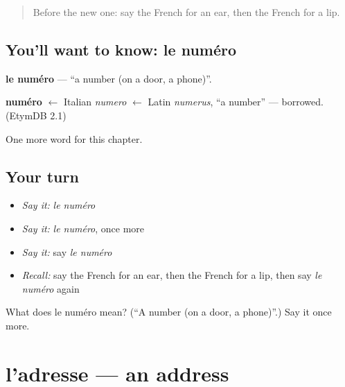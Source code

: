 \label{lesson:FR-C134-numero}



\begin{quote}
Before the new one: say the French for an ear, then the French for a lip.
\end{quote}

\subsection*{You'll want to know: le numéro}
\textbf{le numéro} — \textquotedblleft{}a number (on a door, a phone)\textquotedblright{}.

\begin{cousinweb}
\textbf{numéro} $\leftarrow$ Italian \emph{numero} $\leftarrow$ Latin \emph{numerus}, \textquotedblleft{}a number\textquotedblright{} — borrowed. (EtymDB 2.1)
\end{cousinweb}

\begin{grammarlens}[title={What you've built}]
One more word for this chapter.
\end{grammarlens}

\subsection*{Your turn}
\begin{itemize}
\raggedright
  \item \emph{Say it:} \emph{le numéro}
  \item \emph{Say it:} \emph{le numéro}, once more
  \item \emph{Say it:} say \emph{le numéro}
  \item \emph{Recall:} say the French for an ear, then the French for a lip, then say \emph{le numéro} again
\end{itemize}

\begin{tcolorbox}[breakable,colback=teal!4,colframe=teal!35!black,title={Before you move on}]
What does le numéro mean? (\textquotedblleft{}A number (on a door, a phone)\textquotedblright{}.) Say it once more.
\end{tcolorbox}
\section[l'adresse]{l'adresse — an address}

\label{lesson:FR-C134-adresse}



